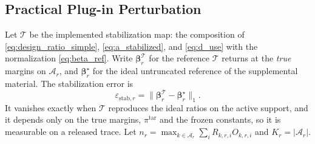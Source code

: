 \documentclass[letterpaper,journal]{IEEEtran}
\begin{document}
\subsection{Practical Plug-in Perturbation}
\label{subsec:prop_plugin}

Let $\mathcal{T}$ be the implemented stabilization map: the composition of
\eqref{eq:design_ratio_simple}, \eqref{eq:a_stabilized}, and \eqref{eq:d_use}
with the normalization \eqref{eq:beta_ref}.  Write
$\boldsymbol\beta_r^{\mathcal T}$ for the reference $\mathcal{T}$ returns at
the \emph{true} margins on $\mathcal{A}_r$, and $\boldsymbol\beta_r^\star$
for the ideal untruncated reference of the supplemental material.  The
stabilization error is
\begin{equation}
\varepsilon_{\mathrm{stab},r}
=
\bigl\|\boldsymbol\beta_r^{\mathcal T}-\boldsymbol\beta_r^\star\bigr\|_1 .
\label{eq:eps_stab}
\end{equation}
It vanishes exactly when $\mathcal{T}$ reproduces the ideal ratios on the
active support, and it depends only on the true margins, $\pi^{\mathrm{tar}}$
and the frozen constants, so it is measurable on a released trace.  Let
$n_r=\max_{k\in\mathcal{A}_r}\sum_i R_{k,r,i}O_{k,r,i}$ and
$K_r=|\mathcal{A}_r|$.
\end{document}
